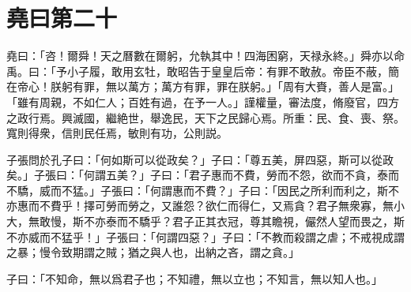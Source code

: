 \section[堯曰第二十]{堯曰第二十}

堯曰：「咨！爾舜！天之曆數在爾躬，允執其中！四海困窮，天禄永終。」舜亦以命禹。曰：「予小子履，敢用玄牡，敢昭告于皇皇后帝：有罪不敢赦。帝臣不蔽，簡在帝心！朕躬有罪，無以萬方；萬方有罪，罪在朕躬。」「周有大賚，善人是富。」「雖有周親，不如仁人；百姓有過，在予一人。」謹權量，審法度，脩廢官，四方之政行焉。興滅國，繼絶世，舉逸民，天下之民歸心焉。所重：民、食、喪、祭。寬則得衆，信則民任焉，敏則有功，公則説。

子張問於孔子曰：「何如斯可以從政矣？」子曰：「尊五美，屏四惡，斯可以從政矣。」子張曰：「何謂五美？」子曰：「君子惠而不費，勞而不怨，欲而不貪，泰而不驕，威而不猛。」子張曰：「何謂惠而不費？」子曰：「因民之所利而利之，斯不亦惠而不費乎！擇可勞而勞之，又誰怨？欲仁而得仁，又焉貪？君子無衆寡，無小大，無敢慢，斯不亦泰而不驕乎？君子正其衣冠，尊其瞻視，儼然人望而畏之，斯不亦威而不猛乎！」子張曰：「何謂四惡？」子曰：「不教而殺謂之虐；不戒視成謂之暴；慢令致期謂之賊；猶之與人也，出納之吝，謂之貪。」

子曰：「不知命，無以爲君子也；不知禮，無以立也；不知言，無以知人也。」
